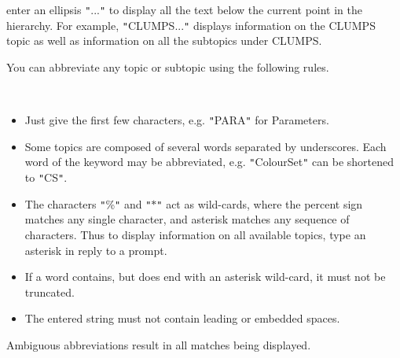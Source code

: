 \documentclass[twoside,11pt]{article}
\renewcommand{\_}{\texttt{\symbol{95}}}
\newcommand{\sstitemlist}[1]{
  \mbox{} \\
  \vspace{-3.5ex}
  \begin{itemize}
     #1
  \end{itemize}
}
\newcommand{\sstitem}{\item}
\newcommand{\sstitemlist}[1]{
      \begin{itemize}
         #1
      \end{itemize}
      \\
   }
\newcommand{\sstitem}{\item}
\begin{document}
{{{         \sstitem
            enter an ellipsis {\tt "}...{\tt "} to display all the text below the
               current point in the hierarchy.  For example, {\tt "}CLUMPS...{\tt "}
               displays information on the CLUMPS topic as well as
               information on all the subtopics under CLUMPS.

      }
      You can abbreviate any topic or subtopic using the following
      rules.

      \sstitemlist{

         \sstitem
            Just give the first few characters, e.g. {\tt "}PARA{\tt "} for
               Parameters.

         \sstitem
            Some topics are composed of several words separated by
               underscores.  Each word of the keyword may be abbreviated,
               e.g. {\tt "}Colour\_Set{\tt "} can be shortened to {\tt "}C\_S{\tt "}.

         \sstitem
            The characters {\tt "}\%{\tt "} and {\tt "}$*${\tt "} act as wild-cards, where the
               percent sign matches any single character, and asterisk
               matches any sequence of characters.  Thus to display
               information on all available topics, type an asterisk in
               reply to a prompt.

         \sstitem
            If a word contains, but does end with an asterisk wild-card,
               it must not be truncated.

         \sstitem
            The entered string must not contain leading or embedded
               spaces.

      }
      Ambiguous abbreviations result in all matches being displayed.
   }
}
\end{document}
